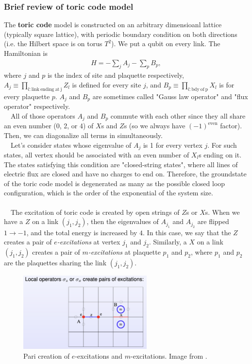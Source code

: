 \documentclass{ltjsarticle}
\theoremstyle{mystyle} %
\numberwithin{equation}{section}
\begin{document}
\subsubsection{Brief review of toric code model}
The \textbf{toric code} model is constructed on 
an arbitrary dimensioanl lattice (typically square lattice), with periodic boundary condition on both directions 
(i.e. the Hilbert space is on torus $T^2$). 
We put a qubit on every link. 
The Hamiltonian is 
\begin{align}
    H=-\sum_j A_j - \sum_p B_p, 
    \label{TCmodel}
\end{align}
where $j$ and $p$ is the index of site and plaquette respectively, 
$A_{j}\equiv \prod_{l:\mathrm{link~ending~at~j}} Z_l$ is defined for every site $j$, 
and $B_{p}\equiv \prod_{l:\mathrm{bdy~of~p}} X_l$ is for every plaquette $p$. 
$A_j$ and $B_p$ are sometimes called "Gauss law operator" and "flux operator" respectively. \\
　All of those operators $A_j$ and $B_p$ commute with each other since 
they all share an even number (0, 2, or 4) of $X$s and $Z$s 
(so we always have $(-1)^{\mathrm{even}}$ factor). 
Then, we can diagonalize all terms in \label{TCmodel} simultaneously. \\
　Let's consider states whose eigenvalue of $A_j$ is 1 for every vertex $j$. 
For such states, all vertex should be associated with an even number of $X_l$s ending on it. 
The states satisfying this condition are "closed-string states", 
where all lines of electric flux are closed and have no charges to end on. 
Therefore, the groundstate of the toric code model is degenerated as many as the possible closed loop configuration, 
which is the order of the exponential of the system size. \\\\
　The excitation of toric code is created by open strings of $Z$s or $X$s. 
When we have a $Z$ on a link $(j_1, j_2)$, then 
the eigenvalues of $A_{j_1}$ and $A_{j_2}$ are flipped $1\to -1$, 
and the total energy is increased by $4$. 
In this case, we say that the $Z$ creates a pair of \textit{$e$-excitations} at vertex $j_1$ and $j_2$. 
Similarly, a $X$ on a link $(j_1, j_2)$ creates 
a pair of \textit{$m$-excitations} at plaquette $p_1$ and $p_2$, 
where $p_1$ and $p_2$ are the plaquettes sharing the link $(j_1, j_2)$. 
 \begin{figure}[H]
     \centering
     \includegraphics[width=0.6\textwidth]{eandm.png}
     \caption{Pari creation of $e$-excitations and $m$-excitations. Image from \cite{DXN}. }
     \label{fig:label}
 \end{figure}
\end{document}
